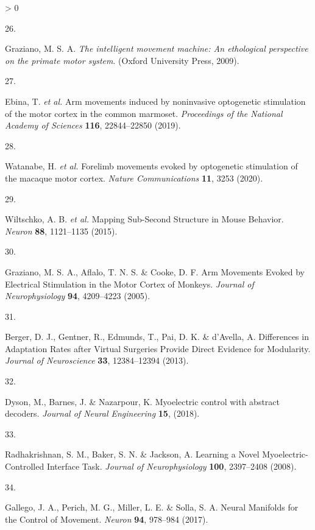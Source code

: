 \documentclass[
  a4paper,
]{article}
\newlength{\cslhangindent}
\newlength{\csllabelwidth}
\newenvironment{CSLReferences}[2] %
 {%
  \setlength{\parindent}{0pt}
  \ifodd #1 \everypar{\setlength{\hangindent}{\cslhangindent}}\ignorespaces\fi
  \ifnum #2 > 0
  \setlength{\parskip}{#2\baselineskip}
  \fi
 }%
 {}
\newcommand{\CSLLeftMargin}[1]{\parbox[t]{\csllabelwidth}{#1}}
\newcommand{\CSLRightInline}[1]{\parbox[t]{\linewidth - \csllabelwidth}{#1}\break}
\begin{document}
\begin{CSLReferences}{0}{0}
\leavevmode\hypertarget{ref-grazianoIntelligentMovementMachine2009}{}%
\CSLLeftMargin{26. }
\CSLRightInline{Graziano, M. S. A. \emph{The intelligent movement
machine: An ethological perspective on the primate motor system}.
({Oxford University Press}, 2009).}

\leavevmode\hypertarget{ref-ebina2019}{}%
\CSLLeftMargin{27. }
\CSLRightInline{Ebina, T. \emph{et al.} Arm movements induced by
noninvasive optogenetic stimulation of the motor cortex in the common
marmoset. \emph{Proceedings of the National Academy of Sciences}
\textbf{116}, 22844--22850 (2019).}

\leavevmode\hypertarget{ref-watanabeForelimbMovementsEvoked2020}{}%
\CSLLeftMargin{28. }
\CSLRightInline{Watanabe, H. \emph{et al.} Forelimb movements evoked by
optogenetic stimulation of the macaque motor cortex. \emph{Nature
Communications} \textbf{11}, 3253 (2020).}

\leavevmode\hypertarget{ref-wiltschkoMappingSubSecondStructure2015}{}%
\CSLLeftMargin{29. }
\CSLRightInline{Wiltschko, A. B. \emph{et al.} Mapping {Sub}-{Second
Structure} in {Mouse Behavior}. \emph{Neuron} \textbf{88}, 1121--1135
(2015).}

\leavevmode\hypertarget{ref-graziano2005}{}%
\CSLLeftMargin{30. }
\CSLRightInline{Graziano, M. S. A., Aflalo, T. N. S. \& Cooke, D. F. Arm
{Movements Evoked} by {Electrical Stimulation} in the {Motor Cortex} of
{Monkeys}. \emph{Journal of Neurophysiology} \textbf{94}, 4209--4223
(2005).}

\leavevmode\hypertarget{ref-BergerDifferencesInAdaptationRates2013a}{}%
\CSLLeftMargin{31. }
\CSLRightInline{Berger, D. J., Gentner, R., Edmunds, T., Pai, D. K. \&
d'Avella, A. Differences in {Adaptation Rates} after {Virtual Surgeries
Provide Direct Evidence} for {Modularity}. \emph{Journal of
Neuroscience} \textbf{33}, 12384--12394 (2013).}

\leavevmode\hypertarget{ref-Dyson2018}{}%
\CSLLeftMargin{32. }
\CSLRightInline{Dyson, M., Barnes, J. \& Nazarpour, K. Myoelectric
control with abstract decoders. \emph{Journal of Neural Engineering}
\textbf{15}, (2018).}

\leavevmode\hypertarget{ref-radhakrishnanLearningNovelMyoelectricControlled2008}{}%
\CSLLeftMargin{33. }
\CSLRightInline{Radhakrishnan, S. M., Baker, S. N. \& Jackson, A.
Learning a {Novel Myoelectric}-{Controlled Interface Task}.
\emph{Journal of Neurophysiology} \textbf{100}, 2397--2408 (2008).}

\leavevmode\hypertarget{ref-Gallego2017}{}%
\CSLLeftMargin{34. }
\CSLRightInline{Gallego, J. A., Perich, M. G., Miller, L. E. \& Solla,
S. A. Neural {Manifolds} for the {Control} of {Movement}. \emph{Neuron}
\textbf{94}, 978--984 (2017).}


\end{CSLReferences}
\end{document}
